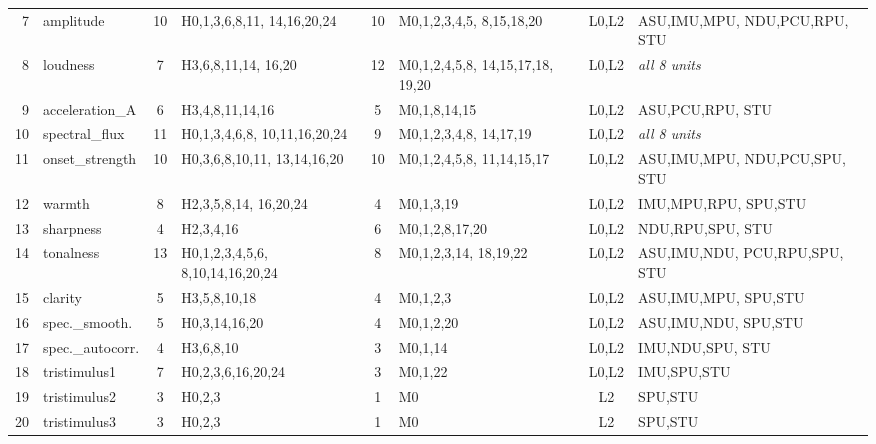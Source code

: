 {\begin{longtable}{@{}
  r
  >{\raggedright}p{2.1cm}
  c
  >{\raggedright}p{3.5cm}
  c
  >{\raggedright}p{3.0cm}
  c
  >{\raggedright\arraybackslash}p{2.8cm}
@{}}
\rowcolor{grpB}
7  & amplitude        & 10 & H0,1,3,6,8,11, 14,16,20,24
   & 10 & M0,1,2,3,4,5, 8,15,18,20 & L0,L2
   & ASU,IMU,MPU, NDU,PCU,RPU, STU \\
\rowcolor{grpB}
8  & loudness         &  7 & H3,6,8,11,14, 16,20
   & 12 & M0,1,2,4,5,8, 14,15,17,18, 19,20 & L0,L2
   & \textit{all 8 units} \\
\rowcolor{grpB}
9  & acceleration\_A  &  6 & H3,4,8,11,14,16
   & 5  & M0,1,8,14,15 & L0,L2
   & ASU,PCU,RPU, STU \\
\rowcolor{grpB}
10 & spectral\_flux   & 11 & H0,1,3,4,6,8, 10,11,16,20,24
   & 9  & M0,1,2,3,4,8, 14,17,19 & L0,L2
   & \textit{all 8 units} \\
\rowcolor{grpB}
11 & onset\_strength  & 10 & H0,3,6,8,10,11, 13,14,16,20
   & 10 & M0,1,2,4,5,8, 11,14,15,17 & L0,L2
   & ASU,IMU,MPU, NDU,PCU,SPU, STU \\

\rowcolor{grpC}
12 & warmth           &  8 & H2,3,5,8,14, 16,20,24
   & 4  & M0,1,3,19 & L0,L2
   & IMU,MPU,RPU, SPU,STU \\
\rowcolor{grpC}
13 & sharpness        &  4 & H2,3,4,16
   & 6  & M0,1,2,8,17,20 & L0,L2
   & NDU,RPU,SPU, STU \\
\rowcolor{grpC}
14 & tonalness        & 13 & H0,1,2,3,4,5,6, 8,10,14,16,20,24
   & 8  & M0,1,2,3,14, 18,19,22 & L0,L2
   & ASU,IMU,NDU, PCU,RPU,SPU, STU \\
\rowcolor{grpC}
15 & clarity          &  5 & H3,5,8,10,18
   & 4  & M0,1,2,3 & L0,L2
   & ASU,IMU,MPU, SPU,STU \\
\rowcolor{grpC}
16 & spec.\_smooth.   &  5 & H0,3,14,16,20
   & 4  & M0,1,2,20 & L0,L2
   & ASU,IMU,NDU, SPU,STU \\
\rowcolor{grpC}
17 & spec.\_autocorr. &  4 & H3,6,8,10
   & 3  & M0,1,14 & L0,L2
   & IMU,NDU,SPU, STU \\
\rowcolor{grpC}
18 & tristimulus1     &  7 & H0,2,3,6,16,20,24
   & 3  & M0,1,22 & L0,L2
   & IMU,SPU,STU \\
\rowcolor{grpC}
19 & tristimulus2     &  3 & H0,2,3
   & 1  & M0 & L2
   & SPU,STU \\
\rowcolor{grpC}
20 & tristimulus3     &  3 & H0,2,3
   & 1  & M0 & L2
   & SPU,STU \\


\end{longtable}}
